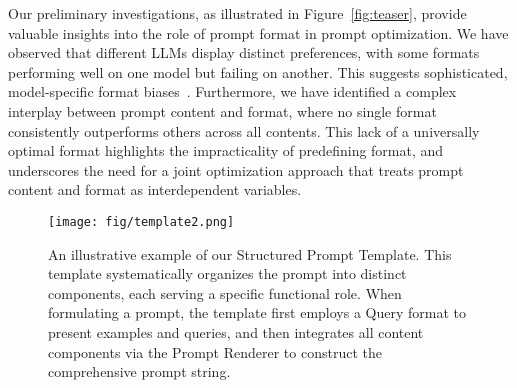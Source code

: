 Our preliminary investigations, as illustrated in Figure~\ref{fig:teaser}, provide valuable insights into the role of prompt format in prompt optimization. We have observed that different LLMs display distinct preferences, with some formats performing well on one model but failing on another. This suggests sophisticated, model-specific format biases~\cite{C_2024ICLR_formatspread}. Furthermore, we have identified a complex interplay between prompt content and format, where no single format consistently outperforms others across all contents. This lack of a universally optimal format highlights the impracticality of predefining format, and underscores the need for a joint optimization approach that treats prompt content and format as interdependent variables.

\begin{figure*}[t]
  \vspace{-2ex}
  \texttt{[image: fig/template2.png]}
  \vspace{-4.5ex}
  \caption {An illustrative example of our Structured Prompt Template. This template systematically organizes the prompt into distinct components, each serving a specific functional role. When formulating a prompt, the template first employs a Query format to present examples and queries, and then integrates all content components via the Prompt Renderer to construct the comprehensive prompt string.}
  \vspace{-2ex}
  \label{fig:template}
\end{figure*}

